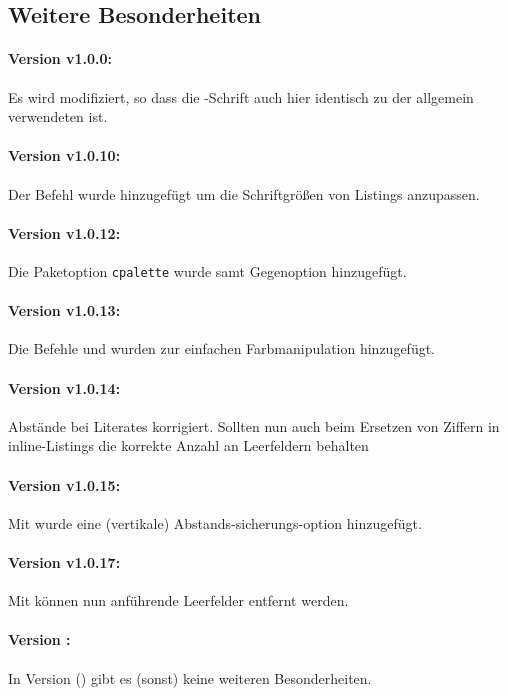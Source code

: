 \documentclass{sopra-base}
\begin{document}
\subsection{Weitere Besonderheiten}
\paragraph{Version v1.0.0:} Es wird  modifiziert, so dass die -Schrift auch hier identisch zu der allgemein verwendeten ist.
\paragraph{Version v1.0.10:} Der Befehl  wurde hinzugefügt um die
Schriftgrößen von Listings anzupassen.
\paragraph{Version v1.0.12:} Die Paketoption \texttt{cpalette} wurde samt Gegenoption hinzugefügt.
\paragraph{Version v1.0.13:} Die Befehle  und  wurden zur einfachen Farbmanipulation hinzugefügt.
\paragraph{Version v1.0.14:} Abstände bei Literates korrigiert. Sollten nun auch beim Ersetzen von Ziffern in inline-Listings die korrekte Anzahl an Leerfeldern behalten
\paragraph{Version v1.0.15:} Mit  wurde eine (vertikale) Abstands-sicherungs-option hinzugefügt.
\paragraph{Version v1.0.17:} Mit  können nun anführende Leerfelder entfernt werden.
\paragraph{Version \thesolversion:}
In Version \thesolversion{} () gibt es (sonst) keine weiteren
Besonderheiten.
\end{document}
